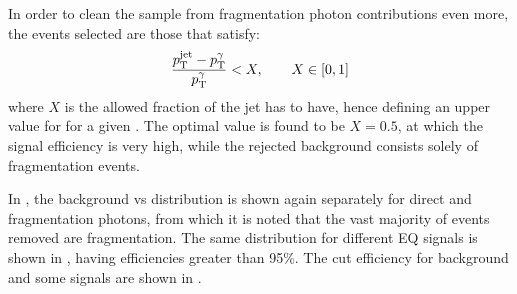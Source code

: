 In order to clean the sample from fragmentation photon contributions even more, the events selected are those that satisfy:
\begin{equation}
    \label{eq:evt_selection:sr_opt:jet_pt:jet_pt_rel_X}
    \frac{p_{\text{T}}^\text{jet} - p_{\text{T}}^{\gamma}}{p_{\text{T}}^{\gamma}} < X, \qquad X \in [0, 1]
\end{equation}
where \(X\) is the allowed fraction of \ptgam the jet has to have, hence defining an upper value for \ptjet for a given \ptgam. The optimal value is found to be \(X=0.5\), at which the signal efficiency is very high, while the rejected background consists solely of fragmentation events.

In \Fig{\ref{fig:evt_selection:sr_opt:jet_pt:ptgam_ptjet_X0.5}}, the background \ptgam vs \ptjet distribution is shown again separately for direct and fragmentation photons, from which it is noted that the vast majority of events removed are fragmentation. The same distribution for different \ac{EQ} signals is shown in \Fig{\ref{fig:evt_selection:sr_opt:jet_pt:ptgam_ptjet_signals}}, having efficiencies greater than 95\%. The cut efficiency for background and some \qstar signals are shown in \Tab{\ref{tab:evt_selection:sr_opt:jet_pt:efficiency_selection}}.


